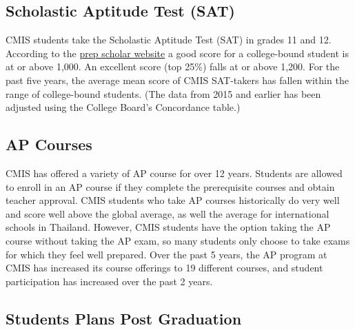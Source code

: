 
\subsection{Scholastic Aptitude Test (SAT)}

CMIS students take the Scholastic Aptitude Test (SAT) in grades 11 and 12.  According to the \href{https://www.prepscholar.com/sat/s/}{prep scholar website} a good score for a college-bound student is at or above 1,000.  An excellent score (top 25\%) falls at or above 1,200.  For the past five years, the average mean score of CMIS SAT-takers has fallen within the range of college-bound students.  (The data from 2015 and earlier has been adjusted using the College Board’s Concordance table.)


\subsection{AP Courses}

CMIS has offered a variety of AP course for over 12 years. Students are allowed to enroll in an AP course if they complete the prerequisite courses and obtain teacher approval.  CMIS students who take AP courses historically do very well and score well above the global average, as well the average for international schools in Thailand.  However, CMIS students have the option taking the AP course without taking the AP exam, so many students only choose to take exams for which they feel well prepared.  Over the past 5 years, the AP program at CMIS has increased its course offerings to 19 different courses, and student participation has increased over the past 2 years.


\subsection{Students Plans Post Graduation}

